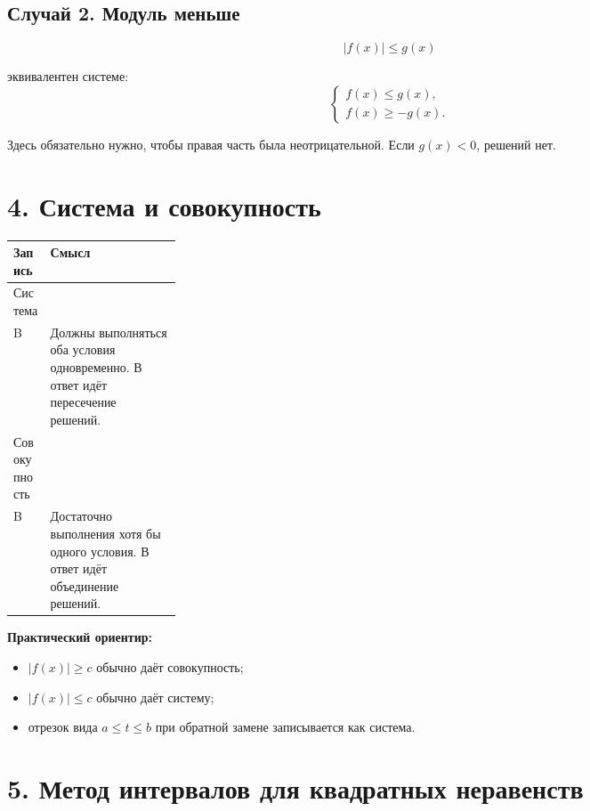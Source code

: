 \documentclass[a4paper,12pt]{article}
\newcommand{\sectionline}{\vspace{2mm}{\color{accent}\hrule height 0.6pt}\vspace{2mm}}
\newcommand{\important}[1]{\textcolor{darkaccent}{\textbf{#1}}}
\begin{document}
\subsection*{Случай 2. Модуль меньше}

\[
|f(x)|\le g(x)
\]

эквивалентен системе:
\[
\left\{
\begin{array}{l}
f(x)\le g(x),\\
f(x)\ge -g(x).
\end{array}
\right.
\]

Здесь обязательно нужно, чтобы правая часть была неотрицательной. Если \(g(x)<0\), решений нет.

\section*{4. Система и совокупность}
\sectionline

\begin{center}
\renewcommand{\arraystretch}{1.35}
\begin{tabularx}{\linewidth}{@{}p{0.22\linewidth}X@{}}
\toprule
\textbf{Запись} & \textbf{Смысл} \\
\midrule
Система \(\left\{\begin{array}{l} A\\ B \end{array}\right.\) &
Должны выполняться оба условия одновременно. В ответ идёт пересечение решений. \\
\addlinespace
Совокупность \(\left[\begin{array}{l} A\\ B \end{array}\right.\) &
Достаточно выполнения хотя бы одного условия. В ответ идёт объединение решений. \\
\bottomrule
\end{tabularx}
\end{center}

\important{Практический ориентир:}
\begin{itemize}
    \item \(|f(x)|\ge c\) обычно даёт совокупность;
    \item \(|f(x)|\le c\) обычно даёт систему;
    \item отрезок вида \(a\le t\le b\) при обратной замене записывается как система.
\end{itemize}

\section*{5. Метод интервалов для квадратных неравенств}
\sectionline
\end{document}

